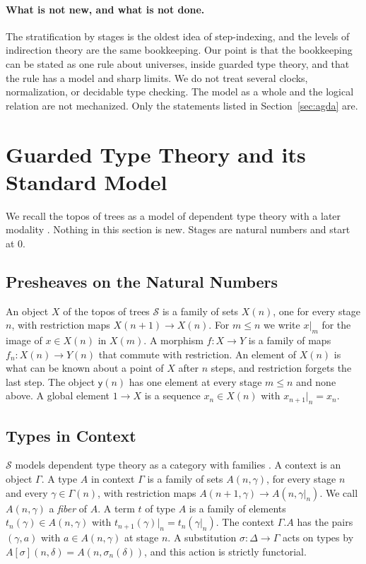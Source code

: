 \documentclass[acmsmall,nonacm,screen]{acmart}
\newcommand{\Tr}{\mathcal{S}}
\newcommand{\yo}{\mathsf{y}}
\newcommand{\rest}[2]{#1|_{#2}}
\begin{document}
\paragraph{What is not new, and what is not done.}
The stratification by stages is the oldest idea of step-indexing, and the levels of
indirection theory \citep{HDA2010} are the same bookkeeping. Our point is that the
bookkeeping can be stated as one rule about universes, inside guarded type theory, and
that the rule has a model and sharp limits. We do not treat several clocks, normalization,
or decidable type checking. The model as a whole and the logical relation are not
mechanized. Only the statements listed in Section~\ref{sec:agda} are.

\section{Guarded Type Theory and its Standard Model}\label{sec:background}

We recall the topos of trees \citep{BMSS2012} as a model of dependent type theory with a later
modality \citep{BM2013,gDTT2016}. Nothing in this section is new. Stages are natural numbers
and start at $0$.

\subsection{Presheaves on the Natural Numbers}

An object $X$ of the topos of trees $\Tr$ is a family of sets $X(n)$, one for every stage
$n$, with restriction maps $X(n+1) \to X(n)$. For $m \le n$ we write $\rest{x}{m}$ for
the image of $x \in X(n)$ in $X(m)$. A morphism $f : X \to Y$ is a family of maps
$f_n : X(n) \to Y(n)$ that commute with restriction. An element of $X(n)$ is what can be
known about a point of $X$ after $n$ steps, and restriction forgets the last step. The
object $\yo(n)$ has one element at every stage $m \le n$ and none above. A global element
$1 \to X$ is a sequence $x_n \in X(n)$ with $\rest{x_{n+1}}{n} = x_n$.

\subsection{Types in Context}

$\Tr$ models dependent type theory as a category with families
\citep{Dybjer1996,Hofmann1997}. A context is an object $\Gamma$. A type $A$ in context
$\Gamma$ is a family of sets $A(n,\gamma)$, for every stage $n$ and every
$\gamma \in \Gamma(n)$, with restriction maps $A(n+1,\gamma) \to A(n,\rest{\gamma}{n})$. We
call $A(n,\gamma)$ a \emph{fiber} of $A$. A term $t$ of type $A$ is a family of elements
$t_n(\gamma) \in A(n,\gamma)$ with $\rest{t_{n+1}(\gamma)}{n} = t_n(\rest{\gamma}{n})$. The
context $\Gamma.A$ has the pairs $(\gamma,a)$ with $a \in A(n,\gamma)$ at stage $n$. A
substitution $\sigma : \Delta \to \Gamma$ acts on types by
$A[\sigma](n,\delta) = A(n,\sigma_n(\delta))$, and this action is strictly functorial.
\end{document}
